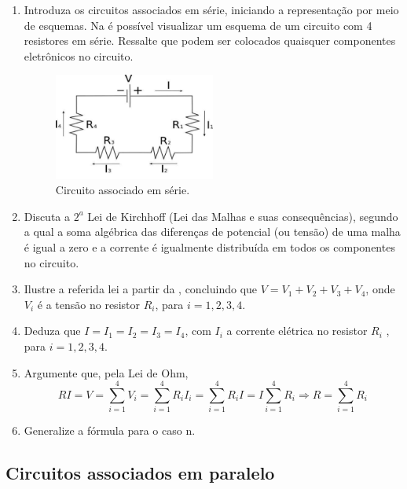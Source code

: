 \documentclass{textolivre}
\begin{document}
\begin{enumerate}
\item Introduza os circuitos associados em série, iniciando a representação por
meio de esquemas. Na  é possível visualizar um esquema de um
circuito com 4 resistores em série. Ressalte que podem ser colocados quaisquer
componentes eletrônicos no circuito.

\begin{figure}[H]
\centering
\includegraphics[width=0.5\textwidth]{figure-29.pdf}
\caption{Circuito associado em série.}
\label{fig19}
\end{figure}

\item Discuta a $2^a$ Lei de Kirchhoff (Lei das Malhas e suas consequências),
segundo a qual a soma algébrica das diferenças de potencial (ou tensão) de uma
malha é igual a zero e a corrente é igualmente distribuída em todos os
componentes no circuito.

\item Ilustre a referida lei a partir da , concluindo que $V=V_1 +
V_2 + V_3 + V_4$, onde $V_i$ é a tensão no resistor $R_i$, para $i=1,2,3,4$.

\item Deduza que $I = I_1 = I_2 = I_3 = I_4$, com $I_i$ a corrente elétrica no
resistor $R_i$ , para $i=1,2,3,4$.

\item Argumente que, pela Lei de Ohm,
\begin{equation*}
RI = V = \sum_{i=1}^{4} V_i = \sum_{i=1}^{4} R_i I_i = \sum_{i=1}^{4} R_i I = I \sum_{i=1}^{4} R_i \Rightarrow R = \sum_{i=1}^{4} R_i
\end{equation*}

\item Generalize a fórmula para o caso n.

\end{enumerate}



\subsection{Circuitos associados em paralelo}\label{sec-circ-ass-p}
\end{document}
